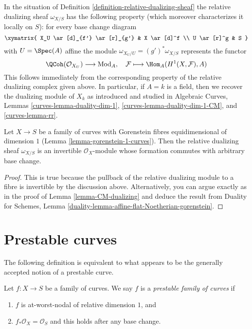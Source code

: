 \noindent
In the situation of Definition \ref{definition-relative-dualizing-sheaf}
the relative dualizing sheaf $\omega_{X/S}$ has the following property
(which moreover characterizes it locally on $S$):
for every base change diagram
$$
\xymatrix{
X_U \ar[d]_{f'} \ar[r]_{g'} & X \ar[d]^f \\
U \ar[r]^g & S
}
$$
with $U = \Spec(A)$ affine the module $\omega_{X_U/U} = (g')^*\omega_{X/S}$
represents the functor
$$
\QCoh(\mathcal{O}_{X_U}) \longrightarrow \text{Mod}_A,\quad
\mathcal{F} \longmapsto \Hom_A(H^1(X, \mathcal{F}), A)
$$
This follows immediately from the corresponding property of the relative
dualizing complex given above. In particular, if $A = k$ is a field,
then we recover the dualizing module of $X_k$ as introduced and studied in
Algebraic Curves, Lemmas \ref{curves-lemma-duality-dim-1},
\ref{curves-lemma-duality-dim-1-CM}, and \ref{curves-lemma-rr}.

\begin{lemma}
\label{lemma-gorenstein-dualizing}
Let $X \to S$ be a family of curves with Gorenstein fibres
equidimensional of dimension $1$ (Lemma \ref{lemma-gorenstein-1-curves}).
Then the relative dualizing sheaf $\omega_{X/S}$ is an
invertible $\mathcal{O}_X$-module whose
formation commutes with arbitrary base change.
\end{lemma}

\begin{proof}
This is true because the pullback of the relative dualizing module
to a fibre is invertible by the discussion above. Alternatively, you
can argue exactly as in the proof of
Lemma \ref{lemma-CM-dualizing} and deduce the result from
Duality for Schemes, Lemma
\ref{duality-lemma-affine-flat-Noetherian-gorenstein}.
\end{proof}









\section{Prestable curves}
\label{section-prestable-curves}

\noindent
The following definition is equivalent to what appears to be the
generally accepted notion of a prestable curve.

\begin{definition}
\label{definition-prestable}
Let $f : X \to S$ be a family of curves. We say $f$ is a
{\it prestable family of curves} if
\begin{enumerate}
\item $f$ is at-worst-nodal of relative dimension $1$, and
\item $f_*\mathcal{O}_X = \mathcal{O}_S$ and this holds after
any base change.
\end{enumerate}
\end{definition}

